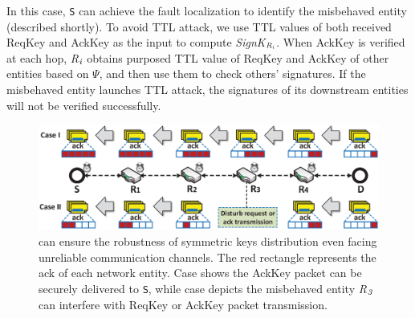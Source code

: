 In this case, {\tt S} can achieve the fault localization to identify the misbehaved entity (described shortly). To avoid TTL attack, we use TTL values of both received ReqKey and AckKey as the input to compute \emph{SignK}$_{\emph{R}_\emph{i}}$. When AckKey is verified at each hop, \emph{R}$_\emph{i}$ obtains purposed TTL value of ReqKey and AckKey of other entities based on $\Psi$, and then use them to check others' signatures. If the misbehaved entity launches TTL attack, the signatures of its downstream entities will not be verified successfully.
\begin{figure}%
\begin{center}
\includegraphics[width=1\columnwidth]{visio/disturbacktransmission.eps}
\caption{\namekey{} can ensure the robustness of symmetric keys distribution even facing unreliable communication channels. The red rectangle represents the ack of each network entity. Case \uppercase\expandafter{} shows the AckKey packet can be securely delivered to {\tt S}, while case \uppercase\expandafter{} depicts the misbehaved entity \emph{R}$_\emph{3}$ can interfere with ReqKey or AckKey packet transmission.}\label{disburbacktransmission}
\end{center}
\vspace{-3mm}
\end{figure}
\vspace{-0.1in}
